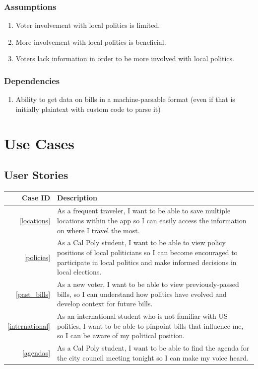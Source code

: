 \documentclass[12pt,oneside,letterpaper]{article}
\begin{document}
\subsubsection{Assumptions}
\begin{enumerate}
\item Voter involvement with local politics is limited.
\item More involvement with local politics is beneficial.
\item Voters lack information in order to be more involved with local politics.
\end{enumerate}

\subsubsection{Dependencies}
\begin{enumerate}
\item Ability to get data on bills in a machine-parsable format (even if that is initially plaintext with custom code to parse it)
\end{enumerate}

\section{Use Cases}
\subsection{User Stories}
\begin{longtabu}{|r|X|}
  \hline
  Case ID & Description \\
  \hline
  \cref{locations} & As a frequent traveler, I want to be able to save
  multiple locations within the app so I can easily access the
  information on where I travel the most. \\
  \hline
  \cref{policies} & As a Cal Poly student, I want to be able to view
  policy positions of local politicians so I can become encouraged to
  participate in local politics and make informed decisions in local
  elections. \\
  \hline
  \cref{past_bills} & As a new voter, I want to be able to view
  previously-passed bills, so I can understand how politics have evolved
  and develop context for future bills. \\
  \hline
  \cref{international} & As an international student who is not
  familiar with US politics, I want to be able to pinpoint bills that
  influence me, so I can be aware of my political position.\\
  \hline
  \cref{agendas} & As a Cal Poly student, I want to be able to
  find the agenda for the city council meeting
  tonight so I can make my voice heard. \\
  \hline
\end{longtabu}
\end{document}
